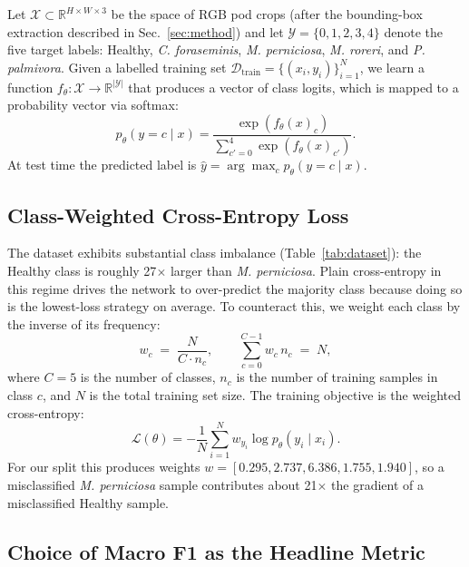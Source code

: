 \documentclass[conference,10pt]{IEEEtran}
\begin{document}
Let $\mathcal{X} \subset \mathbb{R}^{H\times W\times 3}$ be the space of RGB
pod crops (after the bounding-box extraction described in
Sec.~\ref{sec:method}) and let $\mathcal{Y}=\{0,1,2,3,4\}$ denote the five
target labels: Healthy, \textit{C. foraseminis}, \textit{M. perniciosa},
\textit{M. roreri}, and \textit{P. palmivora}. Given a labelled training set
$\mathcal{D}_{\text{train}}=\{(x_i,y_i)\}_{i=1}^{N}$, we learn a function
$f_\theta:\mathcal{X}\rightarrow\mathbb{R}^{|\mathcal{Y}|}$ that produces a
vector of class logits, which is mapped to a probability vector via softmax:
\begin{equation}
p_\theta(y=c\mid x)=\frac{\exp(f_\theta(x)_c)}
{\sum_{c'=0}^{4}\exp(f_\theta(x)_{c'})}.
\end{equation}
At test time the predicted label is $\hat{y}=\arg\max_c p_\theta(y=c\mid x)$.

\subsection{Class-Weighted Cross-Entropy Loss}

The dataset exhibits substantial class imbalance (Table~\ref{tab:dataset}):
the Healthy class is roughly 27$\times$ larger than \textit{M. perniciosa}.
Plain cross-entropy in this regime drives the network to over-predict the
majority class because doing so is the lowest-loss strategy on average. To
counteract this, we weight each class by the inverse of its frequency:
\begin{equation}
w_c \;=\; \frac{N}{C\cdot n_c},
\qquad
\sum_{c=0}^{C-1} w_c\,n_c \;=\; N,
\label{eq:weights}
\end{equation}
where $C=5$ is the number of classes, $n_c$ is the number of training samples
in class $c$, and $N$ is the total training set size. The training objective
is the weighted cross-entropy:
\begin{equation}
\mathcal{L}(\theta)=-\frac{1}{N}\sum_{i=1}^{N} w_{y_i}\log p_\theta(y_i\mid x_i).
\label{eq:loss}
\end{equation}
For our split this produces weights $w=[0.295,2.737,6.386,1.755,1.940]$, so a
misclassified \textit{M. perniciosa} sample contributes about 21$\times$ the
gradient of a misclassified Healthy sample.

\subsection{Choice of Macro F1 as the Headline Metric}
\end{document}
